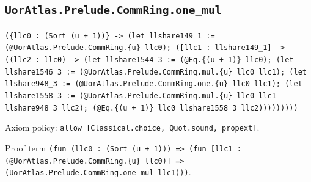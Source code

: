 \documentclass[11pt]{article}
\begin{document}
\subsection*{\texttt{UorAtlas.Prelude.CommRing.one\_mul}}
\noindent\texttt{(\{llc0 : (Sort (u + 1))\} -> (let llshare149\_1 := (@UorAtlas.Prelude.CommRing.\{u\} llc0); ([llc1 : llshare149\_1] -> ((llc2 : llc0) -> (let llshare1544\_3 := (@Eq.\{(u + 1)\} llc0); (let llshare1546\_3 := (@UorAtlas.Prelude.CommRing.mul.\{u\} llc0 llc1); (let llshare948\_3 := (@UorAtlas.Prelude.CommRing.one.\{u\} llc0 llc1); (let llshare1558\_3 := (@UorAtlas.Prelude.CommRing.mul.\{u\} llc0 llc1 llshare948\_3 llc2); (@Eq.\{(u + 1)\} llc0 llshare1558\_3 llc2)))))))))}\par
\noindent Axiom policy: \texttt{allow [Classical.choice, Quot.sound, propext]}.\par
\noindent Proof term \texttt{(fun (llc0 : (Sort (u + 1))) => (fun [llc1 : (@UorAtlas.Prelude.CommRing.\{u\} llc0)] => (UorAtlas.Prelude.CommRing.one\_mul llc1)))}.\par
\end{document}
